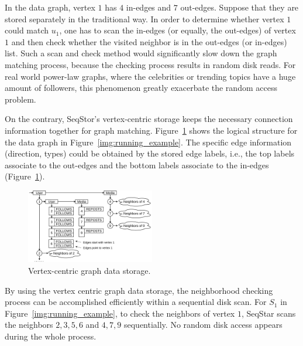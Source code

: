 In the data graph, vertex $1$ has $4$ in-edges and $7$ out-edges.
Suppose that they are stored separately in the traditional way.
In order to determine whether vertex $1$ could match $u_1$,
one has to scan the in-edges (or equally, the out-edges) of vertex $1$ and then check whether the visited neighbor is in the out-edges (or in-edges) list.
Such a scan and check method would significantly slow down the graph matching process,
because the checking process results in random disk reads.
For real world power-law graphs, where the celebrities or trending topics have a huge amount of followers, this phenomenon greatly exacerbate the random access problem.

On the contrary, SeqStor's vertex-centric storage keeps the necessary connection information together for graph matching.
Figure~\ref{img:data_example} shows the logical structure for the data graph in Figure~\ref{img:running_example}.
The specific edge information (direction, types) could be obtained by the stored edge labels, i.e., the top labels associate to the out-edges and the bottom labels associate to the in-edges (Figure~\ref{img:data_example}).

\begin{figure}[ht]
  \centering
  \includegraphics[width=0.5\textwidth]{img/data_example.pdf}
  \caption{Vertex-centric graph data storage.}\label{img:data_example}
\end{figure}

By using the vertex centric graph data storage, the neighborhood checking process can be accomplished efficiently within a sequential disk scan.
For $S_1$ in Figure~\ref{img:running_example},
to check the neighbors of vertex $1$, SeqStar scans the neighbors $2, 3, 5, 6$ and $4, 7, 9$ sequentially.
No random disk access appears during the whole process.
